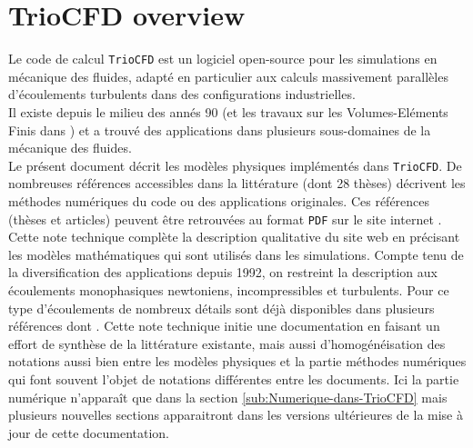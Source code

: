 
\chapter{TrioCFD overview}

Le code de calcul \texttt{TrioCFD} est un logiciel open-source \cite{TrioCFD}
pour les simulations en m\'ecanique des fluides, adapt\'e en particulier
aux calculs massivement parall\`eles d\textquoteright \'ecoulements turbulents
dans des configurations industrielles.\\
Il existe depuis le milieu des ann\'es 90 (et les travaux sur les Volumes-El\'ements
Finis dans \cite{Emon92}) et a trouv\'e des applications dans plusieurs
sous-domaines de la m\'ecanique des fluides.\\

Le pr\'esent document d\'ecrit les mod\`eles physiques impl\'ement\'es dans \texttt{TrioCFD}.
De nombreuses r\'ef\'erences
accessibles dans la litt\'erature (dont 28 th\`eses) d\'ecrivent les m\'ethodes
num\'eriques du code ou des applications originales. Ces r\'ef\'erences
(th\`eses et articles) peuvent \^etre retrouv\'ees au format \texttt{PDF}
sur le site internet \cite{TrioCFD}. Cette note technique compl\`ete
la description qualitative du site web en pr\'ecisant les mod\`eles math\'ematiques
qui sont utilis\'es dans les simulations. Compte tenu de la diversification
des applications depuis 1992, on restreint la description aux \'ecoulements
monophasiques newtoniens, incompressibles et turbulents. Pour ce type
d'\'ecoulements de nombreux d\'etails sont d\'ej\`a disponibles dans plusieurs
r\'ef\'erences dont \cite[etc ...]{Angeli_etal_NURETH2015,Angeli_etal_FVCA2017,TrioCFD}.
Cette note technique initie une documentation en faisant un effort
de synth\`ese de la litt\'erature existante, mais aussi d'homog\'en\'eisation
des notations aussi bien entre les \og mod\`eles physiques \fg{} et
la partie \og m\'ethodes num\'eriques \fg{} qui font souvent l'objet
de notations diff\'erentes entre les documents. Ici la partie num\'erique
n'appara\^it que dans la section \ref{sub:Numerique-dans-TrioCFD}
mais plusieurs nouvelles sections apparaitront dans les versions ult\'erieures
de la mise \`a jour de cette documentation.

